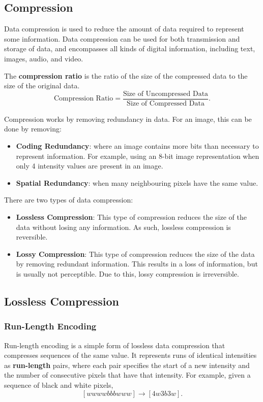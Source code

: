 \documentclass{article}
\begin{document}
\subsection{Compression}
Data compression is used to reduce the amount of data required to
represent some information. Data compression can be used for both
transmission and storage of data, and encompasses all kinds of digital
information, including text, images, audio, and video.
\begin{definition}
    The \textbf{compression ratio} is the ratio of the size of the
    compressed data to the size of the original data.
    \begin{equation*}
        \text{Compression Ratio} = \frac{\text{Size of Uncompressed Data}}{\text{Size of Compressed Data}}.
    \end{equation*}
\end{definition}
Compression works by removing redundancy in data. For an image, this can
be done by removing:
\begin{itemize}
    \item \textbf{Coding Redundancy}: where an image contains more bits
          than necessary to represent information. For example, using an 8-bit
          image representation when only 4 intensity values are present in an
          image.
    \item \textbf{Spatial Redundancy}: when many neighbouring pixels
          have the same value.
\end{itemize}
There are two types of data compression:
\begin{itemize}
    \item \textbf{Lossless Compression}: This type of compression
          reduces the size of the data without losing any information.
          As such, lossless compression is reversible.
    \item \textbf{Lossy Compression}: This type of compression reduces
          the size of the data by removing redundant information. This
          results in a loss of information, but is usually not
          perceptible. Due to this, lossy compression is irreversible.
\end{itemize}
\subsection{Lossless Compression}
\subsubsection{Run-Length Encoding}
Run-length encoding is a simple form of lossless data compression that
compresses sequences of the same value. It represents runs of identical
intensities as \textbf{run-length} pairs, where each pair specifies the
start of a new intensity and the number of consecutive pixels that have
that intensity. For example, given a sequence of black and white
pixels,
\begin{equation*}
    \left[ w w w w b b b w w w \right] \to \left[ 4w 3b 3w \right].
\end{equation*}
\end{document}
